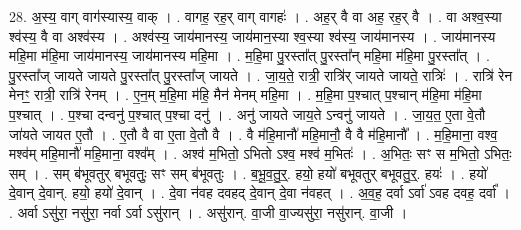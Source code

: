 \documentclass[17pt]{extarticle}
\begin{document}
28. अ॒स्य॒ वाग् वाग॑स्यास्य॒ वाक् । . वागह॒ रह॒र् वाग् वागहः॑ । . अह॒र् वै वा अह॒ रह॒र् वै । . वा अश्व॒स्या श्व॑स्य॒ वै वा अश्व॑स्य । . अश्व॑स्य॒ जाय॑मानस्य॒ जाय॑मान॒स्या श्व॒स्या श्व॑स्य॒ जाय॑मानस्य । . जाय॑मानस्य महि॒मा म॑हि॒मा जाय॑मानस्य॒ जाय॑मानस्य महि॒मा । . म॒हि॒मा पु॒रस्ता᳚त् पु॒रस्ता᳚न् महि॒मा म॑हि॒मा पु॒रस्ता᳚त् । . पु॒रस्ता᳚ज् जायते जायते पु॒रस्ता᳚त् पु॒रस्ता᳚ज् जायते । . जा॒य॒ते॒ रात्री॒ रात्रि॑र् जायते जायते॒ रात्रिः॑ । . रात्रि॑ रेन मेनꣳ॒॒ रात्री॒ रात्रि॑ रेनम् । . ए॒न॒म् म॒हि॒मा म॑हि॒ मैन॑ मेनम् महि॒मा । . म॒हि॒मा प॒श्चात् प॒श्चान् म॑हि॒मा म॑हि॒मा प॒श्चात् । . प॒श्चा दन्वनु॑ प॒श्चात् प॒श्चा दनु॑ । . अनु॑ जायते जाय॒ते ऽन्वनु॑ जायते । . जा॒य॒त॒ ए॒ता वे॒तौ जा॑यते जायत ए॒तौ । . ए॒तौ वै वा ए॒ता वे॒तौ वै । . वै म॑हि॒मानौ॑ महि॒मानौ॒ वै वै म॑हि॒मानौ᳚ । . म॒हि॒माना॒ वश्व॒ मश्व॑म् महि॒मानौ॑ महि॒माना॒ वश्व᳚म् । . अश्व॑ म॒भितो॒ ऽभितो ऽश्व॒ मश्व॑ म॒भितः॑ । . अ॒भितः॒ सꣳ स म॒भितो॒ ऽभितः॒ सम् । . सम् ब॑भूवतुर् बभूवतुः॒ सꣳ सम् ब॑भूवतुः । . ब॒भू॒व॒तु॒र्॒. हयो॒ हयो॑ बभूवतुर् बभूवतु॒र्॒. हयः॑ । . हयो॑ दे॒वान् दे॒वान्. हयो॒ हयो॑ दे॒वान् । . दे॒वा न॑वह दवहद् दे॒वान् दे॒वा न॑वहत् । . अ॒व॒ह॒ दर्वा ऽर्वा॑ ऽवह दवह॒ दर्वा᳚ । . अर्वा ऽसु॑रा॒ नसु॑रा॒ नर्वा ऽर्वा ऽसु॑रान् । . असु॑रान्. वा॒जी वा॒ज्यसु॑रा॒ नसु॑रान्. वा॒जी । \newline
\end{document}
